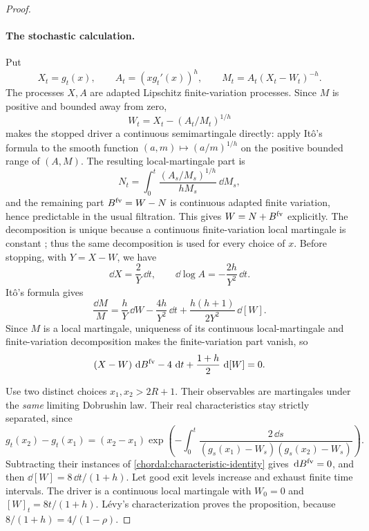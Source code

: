\begin{proof}
\paragraph{The stochastic calculation.}
Put
\[
 X_t=g_t(x),\qquad A_t=(xg_t'(x))^h,
 \qquad M_t=A_t(X_t-W_t)^{-h}.
\]
The processes $X,A$ are adapted Lipschitz finite-variation processes.
Since $M$ is positive and bounded away from zero,
\[
 W_t=X_t-(A_t/M_t)^{1/h}
\]
makes the stopped driver a continuous semimartingale directly:
apply It\^o's formula \cite[Theorem~6.31]{Eberle2019} to the smooth
function $(a,m)\mapsto(a/m)^{1/h}$ on the positive bounded range
of $(A,M)$.  The resulting local-martingale part is
\[
 N_t=\int_0^t
       \frac{(A_s/M_s)^{1/h}}{hM_s}\,\dd M_s,
\]
and the remaining part $B^{\rm fv}=W-N$ is continuous adapted
finite variation, hence predictable in the usual filtration.
This gives $W=N+B^{\rm fv}$ explicitly.  The decomposition is
unique because a continuous finite-variation local martingale is
constant \cite[Corollary~6.22]{Eberle2019}; thus the same
decomposition is used for every choice of $x$.  Before stopping,
with $Y=X-W$, we have
\[
 \dd X=\frac2Y\,\dd t,\qquad
 \dd\log A=-\frac{2h}{Y^2}\,\dd t.
\]
It\^o's formula gives
\[
 \frac{\dd M}{M}
 =\frac hY\,\dd W-\frac{4h}{Y^2}\,\dd t
     +\frac{h(h+1)}{2Y^2}\,\dd[W].
\]
Since $M$ is a local martingale, uniqueness of its continuous
local-martingale and finite-variation decomposition makes the
finite-variation part vanish, so
\begin{equation}\label{chordal:characteristic-identity}
 (X-W)\,\,\mathrm d B^{\rm fv}-4\,\,\mathrm d t
       +\frac{1+h}{2}\,\,\mathrm d[W]=0.
\end{equation}

Use two distinct choices $x_1,x_2>2R+1$.  Their observables are
martingales under the \emph{same} limiting Dobrushin law.  Their
real characteristics stay strictly separated, since
\[
 g_t(x_2)-g_t(x_1)
 =(x_2-x_1)\exp\left(
  -\int_0^t\frac{2\,\dd s}
  {(g_s(x_1)-W_s)(g_s(x_2)-W_s)}\right).
\]
Subtracting their instances of
\eqref{chordal:characteristic-identity} gives
$\,\mathrm d B^{\rm fv}=0$, and then $\dd[W]=8\,\dd t/(1+h)$.
Let good exit levels increase and exhaust finite time intervals.
The driver is a continuous local martingale with $W_0=0$ and
$[W]_t=8t/(1+h)$.  L\'evy's characterization
\cite[Theorem~1.4]{Eberle2019} proves the proposition,
because $8/(1+h)=4/(1-\rho)$.
\end{proof}

